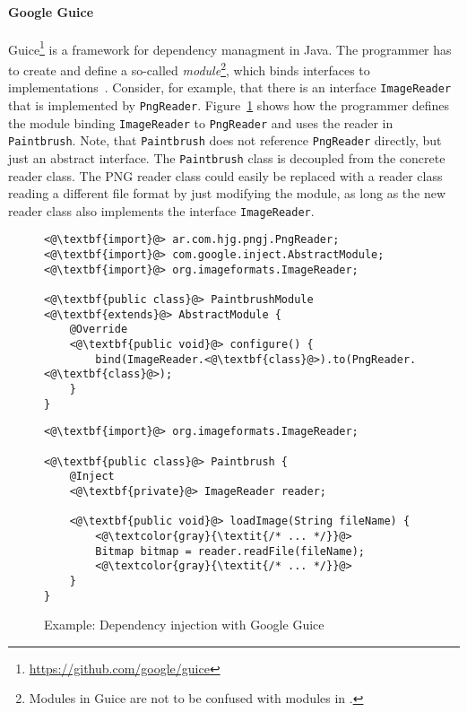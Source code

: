 \paragraph{Google Guice}
Guice\footnote{\url{https://github.com/google/guice}} is a framework for dependency managment in Java. The programmer has to create and define a so-called \emph{module}\footnote{Modules in Guice are not to be confused with modules in \msname.}, which binds interfaces to implementations~\cite{Vanbrabant:2008:GGA:1373340}. Consider, for example, that there is an interface \texttt{ImageReader} that is implemented by \texttt{PngReader}. Figure~\ref{fig:rel_dep_inj_guice} shows how the programmer defines the module binding \texttt{ImageReader} to \texttt{PngReader} and uses the reader in \texttt{Paintbrush}. Note, that \texttt{Paintbrush} does not reference \texttt{PngReader} directly, but just an abstract interface. The \texttt{Paintbrush} class is decoupled from the concrete reader class. The PNG reader class could easily be replaced with a reader class reading a different file format by just modifying the module, as long as the new reader class also implements the interface \texttt{ImageReader}.

\begin{figure}[!htp]
\begin{lstlisting}
<@\textbf{import}@> ar.com.hjg.pngj.PngReader;
<@\textbf{import}@> com.google.inject.AbstractModule;
<@\textbf{import}@> org.imageformats.ImageReader;

<@\textbf{public class}@> PaintbrushModule <@\textbf{extends}@> AbstractModule {
    @Override
    <@\textbf{public void}@> configure() {
        bind(ImageReader.<@\textbf{class}@>).to(PngReader.<@\textbf{class}@>);
    }
}
\end{lstlisting}

\begin{lstlisting}
<@\textbf{import}@> org.imageformats.ImageReader;

<@\textbf{public class}@> Paintbrush {
    @Inject
    <@\textbf{private}@> ImageReader reader;

    <@\textbf{public void}@> loadImage(String fileName) {
        <@\textcolor{gray}{\textit{/* ... */}}@>
        Bitmap bitmap = reader.readFile(fileName);
        <@\textcolor{gray}{\textit{/* ... */}}@>
    }
}
\end{lstlisting}

\caption{Example: Dependency injection with Google Guice}
\label{fig:rel_dep_inj_guice}
\end{figure}

